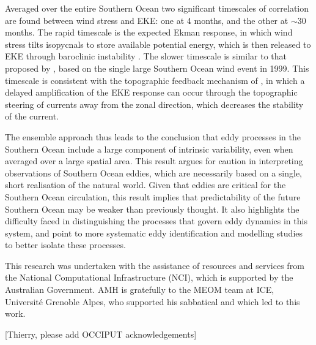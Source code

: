 \documentclass{agujournal2019}
\newcommand{\andycomment}[1]{{\color{blue} [#1]}}
\begin{document}
Averaged over the entire Southern Ocean two significant timescales of correlation are found between wind stress and EKE: one at 4 months, and the other at $\sim$30 months.
The rapid timescale is the expected Ekman response, in which wind stress tilts isopycnals to store available potential energy, which is then released to EKE through baroclinic instability \citep[e.g.][]{Sinha2016}.
The slower timescale is similar to that proposed by \citet{Meredith-Hogg-2006}, based on the single large Southern Ocean wind event in 1999.
This timescale is consistent with the  topographic feedback mechanism of \citet{Hogg-Blundell-2006}, in which a delayed amplification of the EKE response can occur through the topographic steering of currents away from the zonal direction, which decreases the stability of the current.
 
The ensemble approach thus leads to the conclusion that eddy processes in the Southern Ocean include a large component of intrinsic variability, even when averaged over a large spatial area.
This result argues for caution in interpreting observations of Southern Ocean eddies, which are necessarily based on a single, short realisation of the natural world.
Given that eddies are critical for the Southern Ocean circulation, this result implies that predictability of the future Southern Ocean may be weaker than previously thought.
It also highlights the difficulty faced in distinguishing the processes that govern eddy dynamics in this system, and point to more systematic eddy identification and modelling studies to better isolate these processes.
 


\acknowledgments
This research was undertaken with the assistance of resources and services from the National Computational Infrastructure (NCI), which is supported by the Australian Government.
AMH is gratefully to the MEOM team at ICE, Universit{\'e} Grenoble Alpes, who supported his sabbatical and which led to this work.

\andycomment{Thierry, please add OCCIPUT acknowledgements}


\end{document}
